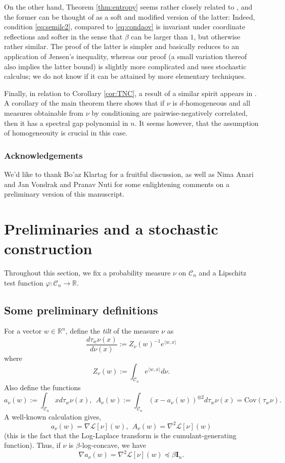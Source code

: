 \documentclass[12pt]{article}
\def \RR {\mathbb R}
\def \DC {\mathcal{C}_n}
\def \Id {\mathbf{I}_n}
\def \COV {\mathrm{Cov}}
\theoremstyle{definition}
\theoremstyle{remark}
\begin{document}
On the other hand, Theorem \ref{thm:entropy} seems rather closely related to \cite[Theorem 5.2]{AOV1}, and the former can be thought of as a soft and modified version of the latter: Indeed, condition \eqref{eq:semilc2}, compared to \eqref{eq:condaov} is invariant under coordinate reflections and softer in the sense that $\beta$ can be larger than $1$, but otherwise rather similar. The proof of the latter is simpler and basically reduces to an application of Jensen's inequality, whereas our proof (a small variation thereof also implies the latter bound) is slightly more complicated and uses stochastic calculus; we do not know if it can be attained by more elementary techniques.

Finally, in relation to Corollary \ref{cor:TNC}, a result of a similar spirit appears in \cite{anari2020spectral}. A corollary of the main theorem there shows that if $\nu$ is $d$-homogeneous and all measures obtainable from $\nu$ by conditioning are pairwise-negatively correlated, then it has a spectral gap polynomial in $n$. It seems however, that the assumption of homogeneouity is crucial in this case. 

\subsubsection*{Acknowledgements}
We'd like to thank Bo'az Klartag for a fruitful discussion, as well as Nima Anari and Jan Vondrak and Pranav Nuti for some enlightening comments on a preliminary version of this manuscript.

\section{Preliminaries and a stochastic construction}
Throughout this section, we fix a probability measure $\nu$ on $\DC$ and a Lipschitz test function $\varphi:\DC \to \RR$.
\subsection{Some preliminary definitions}
For a vector $w \in \RR^n$, define the \emph{tilt} of the measure $\nu$ as
$$
\frac{d \tau_{w} \nu(x)}{d \nu(x)} := Z_\nu(w)^{-1}  e^{\langle w, x \rangle} 
$$
where
$$
Z_\nu(w) := \int_{\DC} e^{\langle w, x \rangle} d \nu.
$$
Also define the functions
$$
a_\nu(w) := \int_{\DC} x d \tau_w \nu(x), ~~ A_\nu(w) := \int_{\DC} \left (x - a_\nu(w) \right )^{\otimes 2} d \tau_w \nu(x) = \COV(\tau_w \nu).
$$
A well-known calculation gives,
\begin{equation}\label{eq:momentgenerating}
a_\nu(w) = \nabla \mathcal{L} [\nu] (w), ~~ A_\nu(w) = \nabla^2 \mathcal{L} [\nu] (w)
\end{equation}
(this is the fact that the Log-Laplace transform is the cumulant-generating function). Thus, if $\nu$ is $\beta$-log-concave, we have
\begin{equation}\label{eq:nablaa}
\nabla a_\nu(w) = \nabla^2 \mathcal{L}[\nu] (w) \preceq \beta \Id.
\end{equation}
\end{document}
